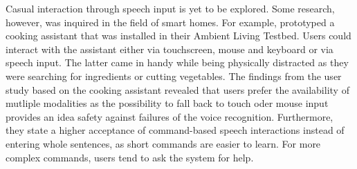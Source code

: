 Casual interaction through speech input is yet to be explored. Some research, however, was inquired in the field of smart homes. For example, \cite{blumendorf2008multimodal} prototyped a cooking assistant that was installed in their Ambient Living Testbed. Users could interact with the assistant either via touchscreen, mouse and keyboard or via speech input. The latter came in handy while being physically distracted as they were searching for ingredients or cutting vegetables. The findings from the user study based on the cooking assistant revealed that users prefer the availability of mutliple modalities as the possibility to fall back to touch oder mouse input provides an idea safety against failures of the voice recognition. Furthermore, they state a higher acceptance of command-based speech interactions instead of entering whole sentences, as short commands are easier to learn. For more complex commands, users tend to ask the system for help.








